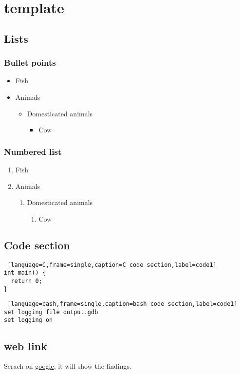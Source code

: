 \chapter{template}

\section{Lists}

\subsection{Bullet points}
\begin{itemize}
  \item Fish
  \item Animals
  \begin{itemize}
    \item Domesticated animals
    \begin{itemize}
      \item Cow
    \end{itemize}
  \end{itemize}
\end{itemize}
  
\subsection{Numbered list}

\begin{enumerate}
  \item Fish
  \item Animals
  \begin{enumerate}
    \item Domesticated animals
    \begin{enumerate}
      \item Cow
    \end{enumerate}
  \end{enumerate}
\end{enumerate}

\section{Code section}
\begin{lstlisting} [language=C,frame=single,caption=C code section,label=code1]
int main() {
  return 0;
}
\end{lstlisting}

\begin{lstlisting} [language=bash,frame=single,caption=bash code section,label=code1]
set logging file output.gdb
set logging on
\end{lstlisting}


\section{web link }
Serach on  \href{https://www.google.com/}{google}, it will show the findings.
